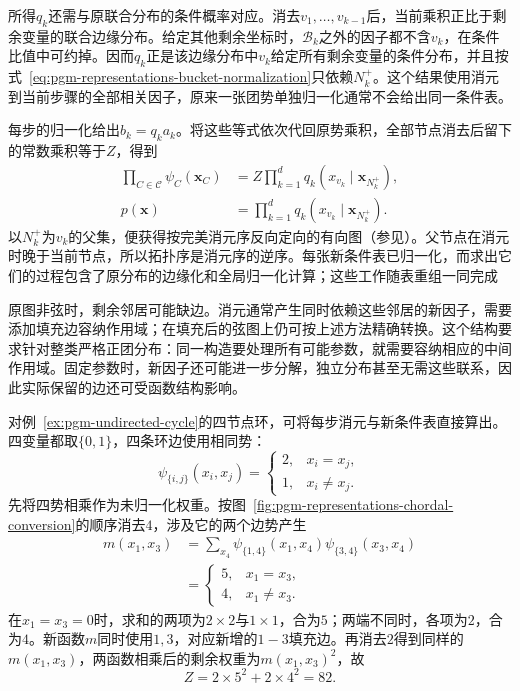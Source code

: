 所得$q_k$还需与原联合分布的条件概率对应。消去$v_1,\ldots,v_{k-1}$后，当前乘积正比于剩余变量的联合边缘分布。给定其他剩余坐标时，$\mathcal{B}_k$之外的因子都不含$v_k$，在条件比值中可约掉。因而$q_k$正是该边缘分布中$v_k$给定所有剩余变量的条件分布，并且按式~\eqref{eq:pgm-representations-bucket-normalization}只依赖$N_k^+$。这个结果使用消元到当前步骤的全部相关因子，原来一张团势单独归一化通常不会给出同一条件表。

每步的归一化给出$b_k=q_k a_k$。将这些等式依次代回原势乘积，全部节点消去后留下的常数乘积等于$Z$，得到
\begin{equation}
  \begin{aligned}
    \prod_{C\in\mathcal{C}}\psi_C(\bm{x}_C)
    &=Z\prod_{k=1}^d q_k(x_{v_k}\mid\bm{x}_{N_k^+}),\\
    p(\bm{x})&=\prod_{k=1}^d q_k(x_{v_k}\mid\bm{x}_{N_k^+}).
  \end{aligned}
  \label{eq:pgm-representations-telescoping-product}
\end{equation}
以$N_k^+$为$v_k$的父集，便获得按完美消元序反向定向的有向图（参见）。父节点在消元时晚于当前节点，所以拓扑序是消元序的逆序。每张新条件表已归一化，而求出它们的过程包含了原分布的边缘化和全局归一化计算；这些工作随表重组一同完成

原图非弦时，剩余邻居可能缺边。消元通常产生同时依赖这些邻居的新因子，需要添加填充边容纳作用域；在填充后的弦图上仍可按上述方法精确转换。这个结构要求针对整类严格正团分布：同一构造要处理所有可能参数，就需要容纳相应的中间作用域。固定参数时，新因子还可能进一步分解，独立分布甚至无需这些联系，因此实际保留的边还可受函数结构影响。

对例~\ref{ex:pgm-undirected-cycle}的四节点环，可将每步消元与新条件表直接算出。四变量都取$\{0,1\}$，四条环边使用相同势：
\begin{equation}
  \psi_{\{i,j\}}(x_i,x_j)=
  \begin{cases}
    2,&x_i=x_j,\\
    1,&x_i\ne x_j.
  \end{cases}
  \label{eq:pgm-representations-cycle-potentials}
\end{equation}
先将四势相乘作为未归一化权重。按图~\ref{fig:pgm-representations-chordal-conversion}的顺序消去$4$，涉及它的两个边势产生
\begin{equation}
  \begin{aligned}
    m(x_1,x_3)
    &=\sum_{x_4}\psi_{\{1,4\}}(x_1,x_4)
    \psi_{\{3,4\}}(x_3,x_4)\\
    &=
    \begin{cases}
      5,&x_1=x_3,\\
      4,&x_1\ne x_3.
    \end{cases}
  \end{aligned}
  \label{eq:pgm-representations-cycle-message}
\end{equation}
在$x_1=x_3=0$时，求和的两项为$2\times2$与$1\times1$，合为$5$；两端不同时，各项为$2$，合为$4$。新函数$m$同时使用$1,3$，对应新增的$1-3$填充边。再消去$2$得到同样的$m(x_1,x_3)$，两函数相乘后的剩余权重为$m(x_1,x_3)^2$，故
\[
  Z=2\times5^2+2\times4^2=82.
\]

